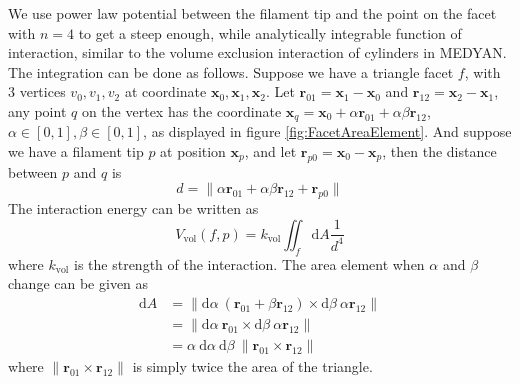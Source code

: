 \documentclass[main.tex]{subfiles}
\begin{document}
We use power law potential between the filament tip and the point on the facet with $n=4$ to get a steep enough, while analytically integrable function of interaction, similar to the volume exclusion interaction of cylinders in MEDYAN. The integration can be done as follows. Suppose we have a triangle facet $f$, with 3 vertices $v_0, v_1, v_2$ at coordinate $\bm{x}_0, \bm{x}_1, \bm{x}_2$. Let $\bm{r}_{01} = \bm{x}_1 - \bm{x}_0$ and $\bm{r}_{12} = \bm{x}_2 - \bm{x}_1$, any point $q$ on the vertex has the coordinate $\bm{x}_q = \bm{x}_0 + \alpha\bm{r}_{01} + \alpha\beta\bm{r}_{12}$, $\alpha\in[0,1], \beta\in[0,1]$, as displayed in figure \ref{fig:FacetAreaElement}. And suppose we have a filament tip $p$ at position $\bm{x}_p$, and let $\bm{r}_{p0} = \bm{x}_0 - \bm{x}_p$, then the distance between $p$ and $q$ is
\begin{equation}
d = \| \alpha\bm{r}_{01} + \alpha\beta\bm{r}_{12} + \bm{r}_{p0} \|
\end{equation}
The interaction energy can be written as
\begin{equation}
V_\text{vol}(f, p) = k_\text{vol} \iint_f \mathrm{d}A \frac1{d^4}
\label{eq:TriangleBeadVolumeExclusionIntegral}
\end{equation}
where $k_\text{vol}$ is the strength of the interaction. The area element when $\alpha$ and $\beta$ change can be given as
\begin{equation}
\begin{aligned}
\mathrm{d}A &= \| \mathrm{d}\alpha\ \left(\bm{r}_{01} + \beta\bm{r}_{12}\right) \times \mathrm{d}\beta\ \alpha\bm{r}_{12} \|\\
&= \| \mathrm{d}\alpha\ \bm{r}_{01} \times \mathrm{d}\beta\ \alpha\bm{r}_{12} \|\\
&= \alpha\ \mathrm{d}\alpha\ \mathrm{d}\beta\ \| \bm{r}_{01} \times \bm{r}_{12} \|
\end{aligned}
\end{equation}
where $\| \bm{r}_{01} \times \bm{r}_{12} \|$ is simply twice the area of the triangle.
\end{document}
